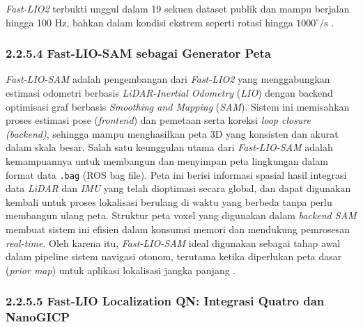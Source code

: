 \emph{Fast-LIO2} terbukti unggul dalam 19 sekuen dataset publik dan mampu berjalan hingga 100 Hz, bahkan dalam kondisi ekstrem seperti rotasi hingga $1000^\circ/\text{s}$ \cite{xu2022fastlio}.

\subsubsection{2.2.5.4 Fast-LIO-SAM sebagai Generator Peta}

\emph{Fast-LIO-SAM} adalah pengembangan dari \emph{Fast-LIO2} yang menggabungkan estimasi odometri berbasis \emph{LiDAR-Inertial Odometry} (\emph{LIO}) dengan backend optimisasi graf berbasis \emph{Smoothing and Mapping} (\emph{SAM}). Sistem ini memisahkan proses estimasi pose (\emph{frontend}) dan pemetaan serta koreksi \emph{loop closure (backend)}, sehingga mampu menghasilkan peta 3D yang konsisten dan akurat dalam skala besar. Salah satu keunggulan utama dari \emph{Fast-LIO-SAM} adalah kemampuannya untuk membangun dan menyimpan peta lingkungan dalam format data \texttt{.bag} (ROS bag file). Peta ini berisi informasi spasial hasil integrasi data \emph{LiDAR} dan \emph{IMU} yang telah dioptimasi secara global, dan dapat digunakan kembali untuk proses lokalisasi berulang di waktu yang berbeda tanpa perlu membangun ulang peta. Struktur peta voxel yang digunakan dalam \emph{backend SAM} membuat sistem ini efisien dalam konsumsi memori dan mendukung pemrosesan \emph{real-time}. Oleh karena itu, \emph{Fast-LIO-SAM} ideal digunakan sebagai tahap awal dalam pipeline sistem navigasi otonom, terutama ketika diperlukan peta dasar (\emph{prior map}) untuk aplikasi lokalisasi jangka panjang \cite{xu2022fastlio}.

\subsubsection{2.2.5.5 Fast-LIO Localization QN: Integrasi Quatro dan NanoGICP}

